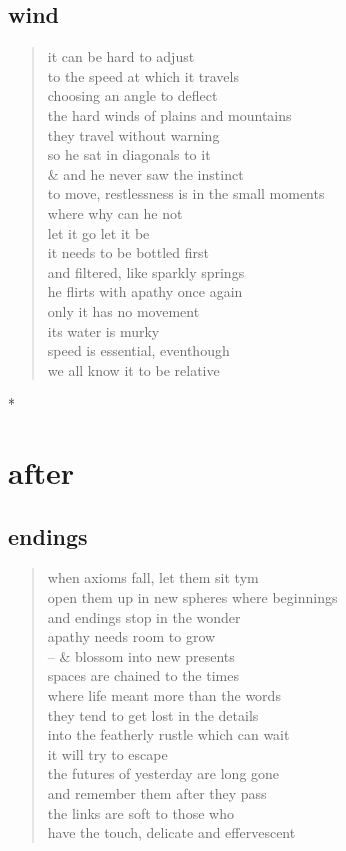 \documentclass[11pt]{article}
\begin{document}
\subsection{wind}
\label{sec:org579f91e}
\begin{verse}
it can be hard to adjust\\
to the speed at which it travels\\
choosing an angle to deflect\\
the hard winds of plains and mountains\\
they travel without warning\\
\vspace*{1em}
so he sat in diagonals to it\\
\& and he never saw the instinct\\
to move, restlessness is in the small moments\\
where why can he not\\
let it go let it be\\
\vspace*{1em}
it needs to be bottled first\\
and filtered, like sparkly springs\\
he flirts with apathy once again\\
only it has no movement\\
its water is murky\\
speed is essential, eventhough\\
we all know it to be relative\\
\end{verse}
*
\section{after}
\label{sec:org59758a1}
\subsection{endings}
\label{sec:org3da134f}
\begin{verse}
when axioms fall,  let them sit tym\\
open them up in new spheres where beginnings\\
and endings stop in the wonder\\
apathy needs room to grow\\
-- \& blossom into new presents\\
\vspace*{1em}
spaces are chained to the times\\
where life meant more than the words\\
they tend to get lost in the details\\
into the featherly rustle which can wait\\
it will try to escape\\
\vspace*{1em}
the futures of yesterday are long gone\\
and remember them after they pass\\
the links are soft to those who\\
have the touch, delicate and effervescent\\
\end{verse}
\end{document}
